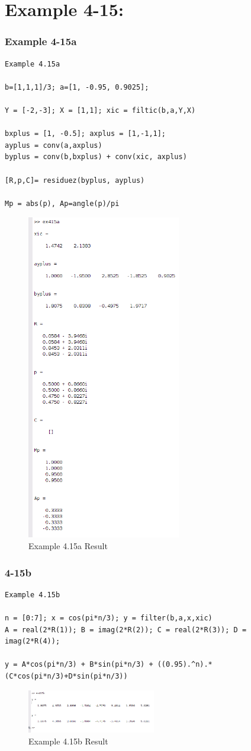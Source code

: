 \documentclass[11pt
  , a4paper
  , article
  , oneside
]{memoir}
\begin{document}
\chapter{Example 4-15:}
\subsection{Example 4-15a}
\begin{lstlisting}[style=termstyle]
Example 4.15a

b=[1,1,1]/3; a=[1, -0.95, 0.9025];

Y = [-2,-3]; X = [1,1]; xic = filtic(b,a,Y,X)

bxplus = [1, -0.5]; axplus = [1,-1,1];
ayplus = conv(a,axplus)
byplus = conv(b,bxplus) + conv(xic, axplus)

[R,p,C]= residuez(byplus, ayplus)

Mp = abs(p), Ap=angle(p)/pi\end{lstlisting}

\begin{figure}[h!]
	\centering
	\includegraphics[width=0.6\textwidth,height=0.4\textwidth]{./images/ex415a.png}
	\caption{Example 4.15a Result}
	\label{fig:Example 4.15a Result}
\end{figure}

\subsection{4-15b}
\begin{lstlisting}[style=termstyle]
Example 4.15b

n = [0:7]; x = cos(pi*n/3); y = filter(b,a,x,xic)
A = real(2*R(1)); B = imag(2*R(2)); C = real(2*R(3)); D = imag(2*R(4));

y = A*cos(pi*n/3) + B*sin(pi*n/3) + ((0.95).^n).*(C*cos(pi*n/3)+D*sin(pi*n/3))
\end{lstlisting}

\begin{figure}[h!]
	\centering
	\includegraphics[width=0.5\textwidth,height=0.3\textwidth]{./images/ex415b.png}
	\caption{Example 4.15b Result}
	\label{fig:Example 4.15b Result}
\end{figure}
\end{document}
